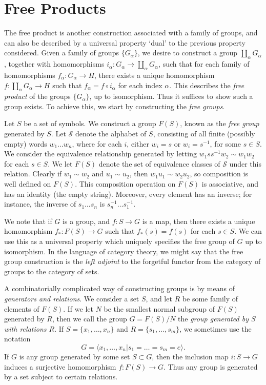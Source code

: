 \section{Free Products}

The free product is another construction associated with a family of groups, and can also be described by a universal property `dual' to the previous property considered. Given a family of groups $\{ G_\alpha \}$, we desire to construct a group $\coprod_\alpha G_\alpha$, together with homomorphisms $i_\alpha: G_\alpha \to \coprod_\alpha G_\alpha$, such that for each family of homomorphisms $f_\alpha: G_\alpha \to H$, there exists a unique homomorphism $f: \coprod_\alpha G_\alpha \to H$ such that $f_\alpha = f \circ i_\alpha$ for each index $\alpha$. This describes the \emph{free product} of the groups $\{ G_\alpha \}$, up to isomorphism. Thus it suffices to show such a group exists. To achieve this, we start by constructing the \emph{free groups}.

Let $S$ be a set of symbols. We construct a group $F(S)$, known as the \emph{free group} generated by $S$. Let $\mathcal{S}$ denote the alphabet of $S$, consisting of all finite (possibly empty) words $w_1 \dots w_n$, where for each $i$, either $w_i = s$ or $w_i = s^{-1}$, for some $s \in S$. We consider the equivalence relationship generated by letting $w_1 ss^{-1} w_2 \sim w_1 w_2$ for each $s \in S$. We let $F(S)$ denote the set of equivalence classes of $\mathcal{S}$ under this relation. Clearly if $w_1 \sim w_2$ and $u_1 \sim u_2$, then $w_1u_1 \sim w_2u_2$, so composition is well defined on $F(S)$. This composition operation on $F(S)$ is associative, and has an identity (the empty string). Moreover, every element has an inverse; for instance, the inverse of $s_1 \dots s_n$ is $s_n^{-1} \dots s_1^{-1}$.

We note that if $G$ is a group, and $f: S \to G$ is a map, then there exists a unique homomorphism $f_*: F(S) \to G$ such that $f_*(s) = f(s)$ for each $s \in S$. We can use this as a universal property which uniquely specifies the free group of $G$ up to isomorphism. In the language of category theory, we might say that the free group construction is the \emph{left adjoint} to the forgetful functor from the category of groups to the category of sets.

A combinatorially complicated way of constructing groups is by means of \emph{generators and relations}. We consider a set $S$, and let $R$ be some family of elements of $F(S)$. If we let $N$ be the smallest normal subgroup of $F(S)$ generated by $R$, then we call the group $G = F(S)/N$ the \emph{group generated by $S$ with relations $R$}. If $S = \{ x_1, \dots, x_n \}$ and $R = \{ s_1, \dots, s_m \}$, we sometimes use the notation
%
\[ G = \langle x_1, \dots, x_n | s_1 = \dots = s_m = e \rangle. \]
%
If $G$ is any group generated by some set $S \subset G$, then the inclusion map $i: S \to G$ induces a surjective homomorphism $f: F(S) \to G$. Thus any group is generated by a set subject to certain relations.


